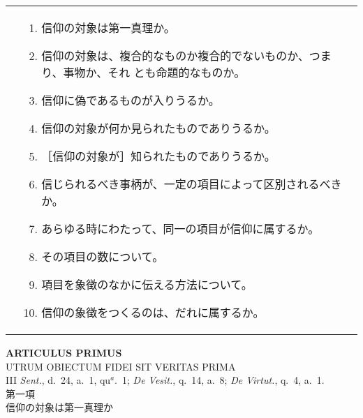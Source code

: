 \documentclass[10pt]{jsarticle} %
\begin{document}
\begin{longtable}{p{21em}p{21em}}
&

\begin{enumerate}
 \item 信仰の対象は第一真理か。
 \item 信仰の対象は、複合的なものか複合的でないものか、つまり、事物か、それ
       とも命題的なものか。
 \item 信仰に偽であるものが入りうるか。
 \item 信仰の対象が何か見られたものでありうるか。
 \item ［信仰の対象が］知られたものでありうるか。
 \item 信じられるべき事柄が、一定の項目によって区別されるべきか。
 \item あらゆる時にわたって、同一の項目が信仰に属するか。
 \item その項目の数について。
 \item 項目を象徴のなかに伝える方法について。
 \item 信仰の象徴をつくるのは、だれに属するか。
\end{enumerate}

\end{longtable}

\newpage


\begin{center}
 {\Large {\bf ARTICULUS PRIMUS}}\\
 {\large UTRUM OBIECTUM FIDEI SIT VERITAS PRIMA}\\
 {\footnotesize III {\itshape Sent.}, d.~24, a.~1, qu$^a$.~1; {\itshape
 De Vesit.}, q.~14, a.~8; {\itshape De Virtut.}, q.~4, a.~1.}\\
 {\Large 第一項\\信仰の対象は第一真理か}
\end{center}
\end{document}
